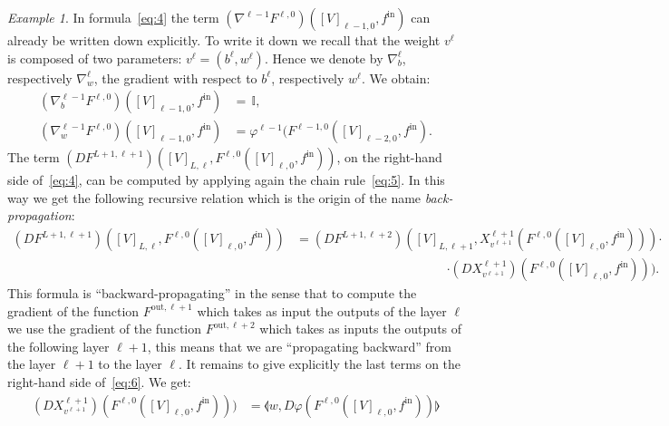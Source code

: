 \documentclass[10pt, a4paper]{article}
\theoremstyle{plain}
\theoremstyle{definition}
\theoremstyle{definition}
\theoremstyle{definition}
\theoremstyle{definition}
\theoremstyle{definition}
\theoremstyle{definition}
\theoremstyle{definition}
\theoremstyle{remark}
\theoremstyle{remark}
\newtheorem{example}[theorem]{Example}
\theoremstyle{rudin-style-generic}
\theoremstyle{rudin-style-generic*}
\theoremstyle{rudin-style-theorem}
\newcommand{\id}{\,\mathbb{I}}
\newcommand*{\fin}{{f^{\text{in}}}}
\begin{document}
\begin{example}
  In formula~\eqref{eq:4} the term $ (\nabla^{\ell-1}  F^{\ell,0})([V]_{\ell-1,0} , \fin )$ can already be written down explicitly.
  To write it down we recall that the weight $v^\ell$ is composed of two parameters:  $v^\ell=(b^\ell,w^\ell)$.
  Hence we denote by $\nabla^\ell_b$, respectively $\nabla^\ell_w$, the gradient with respect to $b^\ell$, respectively $w^\ell$.
  We obtain:
  \begin{equation*}
    \begin{aligned}
      (\nabla^{\ell-1}_b  F^{\ell,0})([V]_{\ell-1,0} , \fin ) &= \id,\\
      (\nabla^{\ell-1}_w  F^{\ell,0})([V]_{\ell-1,0} , \fin ) &= \varphi^{\ell-1}(  F^{\ell-1,0}([V]_{\ell-2,0}, \fin  )
                                                                .
    \end{aligned}
  \end{equation*}
  The term $(D F^{L+1,\ell+1})([V]_{L,\ell}, F^{\ell,0}([V]_{\ell,0}, \fin ) )$, on the right-hand side of~\eqref{eq:4},
  can be computed by applying again the chain rule~\eqref{eq:5}.
  In this way we get the following recursive relation which is the origin of the name \textit{back-propagation}:
  \begin{equation}\label{eq:6}
    \begin{aligned}
      (D F^{L+1,\ell+1})([V]_{L,\ell}, F^{\ell,0}([V]_{\ell,0}, \fin ) )
      &= (D F^{L+1,\ell+2})([V]_{L,\ell+1}, X^{\ell+1}_{v^{\ell+1}} ( F^{\ell,0}([V]_{\ell,0}, \fin ) ) )\mathbf\cdot\\
      & \hspace{5cm}\mathbf\cdot  (DX^{\ell+1}_{v^{\ell+1}}) ( F^{\ell,0}([V]_{\ell,0}, \fin ) ) )
        .
    \end{aligned}
  \end{equation}
  This formula is ``backward-propagating'' in the sense that to compute the gradient of the function $F^{\text{out},\ell+1}$
  which takes as input the outputs of the layer $\ell$ we use the gradient of the function $F^{\text{out},\ell+2}$
  which takes as inputs the outputs of the following layer $\ell+1$, this means that we are ``propagating backward''
  from the layer $\ell+1$ to the layer $\ell$.
  It remains to give explicitly the last terms on the right-hand side of~\eqref{eq:6}.
  We get:
  \begin{equation}
    \label{eq:7}
    \begin{aligned}
      (DX^{\ell+1}_{v^{\ell+1}}) ( F^{\ell,0}([V]_{\ell,0}, \fin ) ) )
      &= \llangle w, D\varphi( F^{\ell,0}([V]_{\ell,0}, \fin )  )\rrangle

\end{aligned}
\end{equation}
\end{example}
\end{document}

